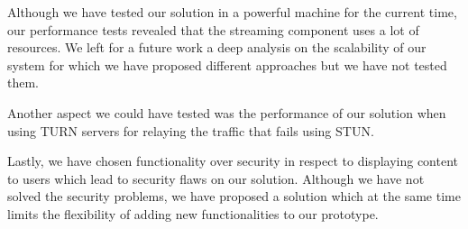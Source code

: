 \documentclass[conference,compsoc,a4paper]{IEEEtran}
\begin{document}
	Although we have tested our solution in a powerful machine for the current time, our performance tests revealed that the streaming component uses a lot of resources. We left for a future work a deep analysis on the scalability of our system for which we have proposed different approaches but we have not tested them.

	Another aspect we could have tested was the performance of our solution when using \gls{TURN} servers for relaying the traffic that fails using \gls{STUN}.

	Lastly, we have chosen functionality over security in respect to displaying content to users which lead to security flaws on our solution. Although we have not solved the security problems, we have proposed a solution which at the same time limits the flexibility of adding new functionalities to our prototype.




%
%

%
\printbibliography
\end{document}
